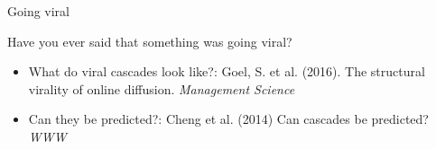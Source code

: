 \documentclass[aspectratio=169]{beamer}
\begin{document}
\begin{frame}

\LARGE{Going viral}

\end{frame}
\begin{frame}

Have you ever said that something was going viral?

\end{frame}
\begin{frame}

\begin{itemize}
\item What do viral cascades look like?: Goel, S. et al. (2016). The structural virality of online diffusion. \textit{Management Science} \pause
\item Can they be predicted?: Cheng et al. (2014) Can cascades be predicted? \textit{WWW}
\end{itemize}

\end{frame}
\end{document}
